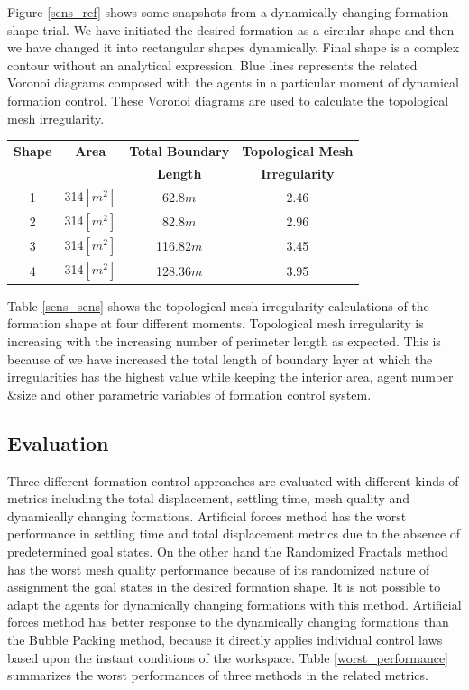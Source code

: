 Figure \ref{sens_ref} shows some snapshots from a dynamically changing formation shape trial. We have initiated the desired formation as a circular shape and then we have changed it into rectangular shapes dynamically. Final shape is a complex contour without an analytical expression. Blue lines represents the related Voronoi diagrams composed with the agents in a particular moment of dynamical formation control. These Voronoi diagrams are used to calculate the topological mesh irregularity. 

\begin{center}
 \label{sens_sens} 
\begin{tabular}{||c| c| c | c||}
				
\hline
\textbf{Shape} & \textbf{Area}  & \textbf{Total Boundary} & \textbf{Topological Mesh}\\ 
 \textbf{}  & \textbf{} & \textbf{Length} & \textbf{Irregularity}\\
\hline
1 & 314$[m^2]$ & 62.8$m$ & 2.46 \\
2 & 314$[m^2]$ & 82.8$m$ & 2.96 \\
3 & 314$[m^2]$ & 116.82$m$ & 3.45 \\
4 & 314$[m^2]$ & 128.36$m$ & 3.95 \\
\hline
\end{tabular}
\end{center}

Table \ref{sens_sens} shows the topological mesh irregularity calculations of the formation shape at four different moments. Topological mesh irregularity is increasing with the increasing number of perimeter length as expected. This is because of we have increased the total length of boundary layer at which the irregularities has the highest value while keeping the interior area, agent number$\&$size and other parametric variables of formation control system. 
\subsection{Evaluation} \label{evaluation_ref}
Three different formation control approaches are evaluated with different kinds of metrics including the total displacement, settling time, mesh quality and dynamically changing formations. Artificial forces method has the worst performance in settling time and total displacement metrics due to the absence of predetermined goal states. On the other hand the Randomized Fractals method has the worst mesh quality performance because of its randomized nature of assignment the goal states in the desired formation shape. It is not possible to adapt the agents for dynamically changing formations with this method. Artificial forces method has better response to the dynamically changing formations than the Bubble Packing method, because it directly applies individual control laws based upon the instant conditions of the workspace. Table \ref{worst_performance} summarizes the worst performances of three methods in the related metrics.
		
